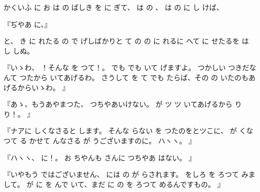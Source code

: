 かくいふ
に
お
は
の
ばしき
を
に
ぎて、
は
の
、
は
の
に
し
けば、

『ぢやあ
に、』

と、
き
に
れたる
の
で
げしばかりと
て
の
の
に
れるに
へて
に
せたるを
は
し
しぬ。

『いゝわ、
！そんな
を
つて！。
でも
でも
いて
げますよ。
つかしい
つきだなんて
つたから
いてあげるわ。
さうして
を
て
でも
たらば、その
の
いたのもあげるからいゝわ。
』

『あゝ、もうあやまつた、
つちやあいけない。
が
ツ
ツ
いてあげるから
り
り！。
』

『ナアに
しくなさると
します。
そんな
らない
を
つたのをとツこに、
が
くなつて
る
かせて
んなさる
が
うございますのに。
ハヽヽ。
』

『ハヽヽ、
に！。
お
ちやんも
さんに
つちやあ
はない。
』

『いやもう
ではございません、
には
の
が
らされます。
をしろ
を
ろつて
みまして。
が
に
を
んで
いて、まだ
に
の
を
ろつて
めるんですもの。
』


